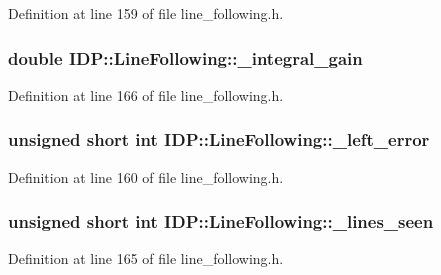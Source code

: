 Definition at line 159 of file line\_\-following.h.

\hypertarget{classIDP_1_1LineFollowing_ac5bcda6c1e88072fbe3868e3135fda27}{
\subsubsection[{\_\-integral\_\-gain}]{\setlength{\rightskip}{0pt plus 5cm}double {\bf IDP::LineFollowing::\_\-integral\_\-gain}}}
\label{classIDP_1_1LineFollowing_ac5bcda6c1e88072fbe3868e3135fda27}


Definition at line 166 of file line\_\-following.h.

\hypertarget{classIDP_1_1LineFollowing_a73eb5dbd030d04809ffe8bf08956517d}{
\subsubsection[{\_\-left\_\-error}]{\setlength{\rightskip}{0pt plus 5cm}unsigned short int {\bf IDP::LineFollowing::\_\-left\_\-error}}}
\label{classIDP_1_1LineFollowing_a73eb5dbd030d04809ffe8bf08956517d}


Definition at line 160 of file line\_\-following.h.

\hypertarget{classIDP_1_1LineFollowing_a21b74d0156ada50603330cc70b17e072}{
\subsubsection[{\_\-lines\_\-seen}]{\setlength{\rightskip}{0pt plus 5cm}unsigned short int {\bf IDP::LineFollowing::\_\-lines\_\-seen}}}
\label{classIDP_1_1LineFollowing_a21b74d0156ada50603330cc70b17e072}


Definition at line 165 of file line\_\-following.h.

